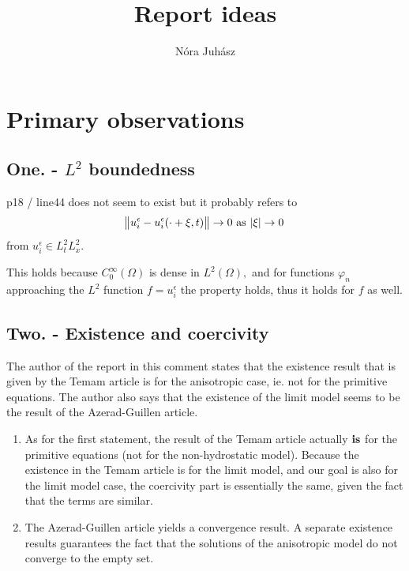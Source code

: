 \documentclass{article}
\title{Report ideas}
\author{N\'ora Juh\'asz}
\begin{document}
\maketitle
\newpage

\tableofcontents
\newpage

\section{Primary observations}

\subsection{One. - $L^2$ boundedness}

p18 / line44 does not seem to exist but it probably refers to $$\norm{u_i^\epsilon - u_i^\epsilon(\cdot + \xi, t)} \to 0 \text{ as } \abs{\xi} \to 0$$ from $u_i^\epsilon \in L^2_t L^2_x.$

This holds because $C^\infty_0 (\Omega)$ is dense in $L^2 (\Omega),$ and for functions $\varphi_n$ approaching the $L^2$ function $f = u_i ^ \epsilon$ the property holds, thus it holds for $f$ as well.

\subsection{Two. - Existence and coercivity}

The author of the report in this comment states that the existence result that is given by the Temam article is for the anisotropic case, ie. not for the primitive equations. The author also says that the existence of the limit model seems to be the result of the Azerad-Guillen article.

\begin{enumerate}

\item As for the first statement, the result of the Temam article actually $\bold{is}$ for the primitive equations (not for the non-hydrostatic model). Because the existence in the Temam article is for the limit model, and our goal is also for the limit model case, the coercivity part is essentially the same, given the fact that the terms are similar.

\item The Azerad-Guillen article yields a convergence result. A separate existence results guarantees the fact that the solutions of the anisotropic model do not converge to the empty set.

\end{enumerate}
\end{document}
